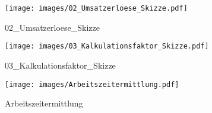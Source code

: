 %
%
%
\begin{figure}[!hb]%
    \centering
  \texttt{[image: images/02\_Umsatzerloese\_Skizze.pdf]}%
  \caption{02_Umsatzerloese_Skizze}%
\end{figure}

%
%
\begin{figure}[!hb]%
    \centering
  \texttt{[image: images/03\_Kalkulationsfaktor\_Skizze.pdf]}%
  \caption{03_Kalkulationsfaktor_Skizze}%
\end{figure}

%
%
\begin{figure}[!hb]%
    \centering
  \texttt{[image: images/Arbeitszeitermittlung.pdf]}%
  \caption{Arbeitszeitermittlung}%
\end{figure}

